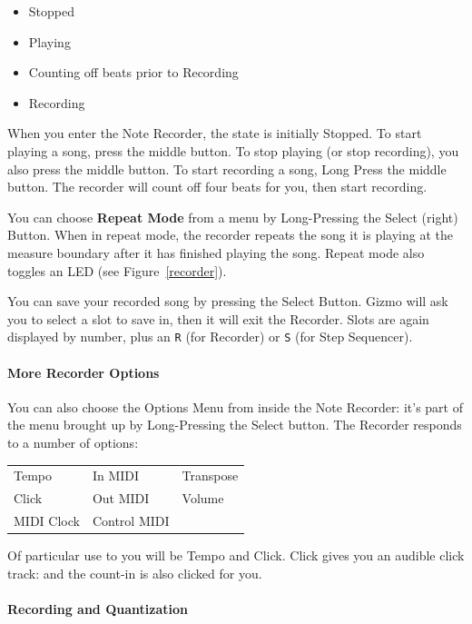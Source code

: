 \documentclass{article}
\begin{document}
\begin{itemize}
\item Stopped
\item Playing
\item Counting off beats prior to Recording
\item Recording
\end{itemize}

When you enter the Note Recorder, the state is initially Stopped.  To start playing a song, press the middle button.  To stop playing (or stop recording), you also press the middle button.  To start recording a song, Long Press the middle button.  The recorder will count off four beats for you, then start recording.

You can choose {\bf Repeat Mode} from a menu by Long-Pressing the Select (right) Button.  When in repeat mode, the recorder repeats the song it is playing at the measure boundary after it has finished playing the song.  Repeat mode also toggles an LED (see Figure~\ref{recorder}).

You can save your recorded song by pressing the Select Button.  Gizmo will ask you to select a slot to save in, then it will exit the Recorder.  Slots are again displayed by number, plus an \texttt{R} (for Recorder) or \texttt{S} (for Step Sequencer).

\paragraph{More Recorder Options}  
You can also choose the Options Menu from inside the Note Recorder: it's part of the menu brought up by Long-Pressing the Select button.  The Recorder responds to a number of options:

\vspace{1em}
\begin{tabular}{lll}
Tempo& 		In MIDI&		Transpose	\\
Click& 			Out MIDI& 	Volume	\\
MIDI Clock& 			Control MIDI	\\
\end{tabular}

\vspace{1em}
Of particular use to you will be Tempo and Click.  Click gives you an audible click track: and the count-in is also clicked for you.

\paragraph{Recording and Quantization}
\end{document}
